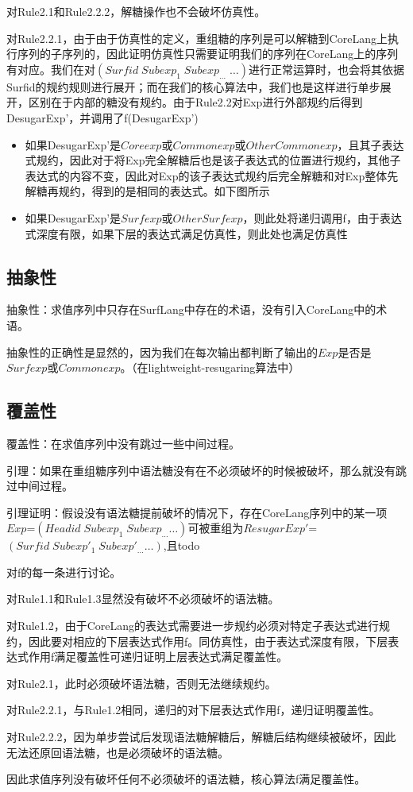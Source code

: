 
对Rule2.1和Rule2.2.2，解糖操作也不会破坏仿真性。

对Rule2.2.1，由于由于仿真性的定义，重组糖的序列是可以解糖到CoreLang上执行序列的子序列的，因此证明仿真性只需要证明我们的序列在CoreLang上的序列有对应。我们在对$(Surfid\;Subexp_{1}\;Subexp_{\ldots}\;\ldots)$进行正常运算时，也会将其依据Surfid的规约规则进行展开；而在我们的核心算法中，我们也是这样进行单步展开，区别在于内部的糖没有规约。由于Rule2.2对Exp进行外部规约后得到DesugarExp'，并调用了f(DesugarExp')
\begin{itemize}
	\item 如果DesugarExp'是$Coreexp$或$Commonexp$或$OtherCommonexp$，且其子表达式规约，因此对于将Exp完全解糖后也是该子表达式的位置进行规约，其他子表达式的内容不变，因此对Exp的该子表达式规约后完全解糖和对Exp整体先解糖再规约，得到的是相同的表达式。如下图所示
	\item 如果DesugarExp'是$Surfexp$或$OtherSurfexp$，则此处将递归调用f，由于表达式深度有限，如果下层的表达式满足仿真性，则此处也满足仿真性
\end{itemize}


\subsection{抽象性}
抽象性：求值序列中只存在SurfLang中存在的术语，没有引入CoreLang中的术语。

抽象性的正确性是显然的，因为我们在每次输出都判断了输出的$Exp$是否是$Surfexp$或$Commonexp$。（在lightweight-resugaring算法中）

\subsection{覆盖性}
覆盖性：在求值序列中没有跳过一些中间过程。

引理：如果在重组糖序列中语法糖没有在不必须破坏的时候被破坏，那么就没有跳过中间过程。

引理证明：假设没有语法糖提前破坏的情况下，存在CoreLang序列中的某一项$Exp$=$(Headid\;Subexp_{1}\;Subexp_{\ldots} \ldots)$可被重组为$ResugarExp'$=$(Surfid\;Subexp'_{1}\;Subexp'_{\ldots} \ldots)$,且todo

对f的每一条进行讨论。

对Rule1.1和Rule1.3显然没有破坏不必须破坏的语法糖。

对Rule1.2，由于CoreLang的表达式需要进一步规约必须对特定子表达式进行规约，因此要对相应的下层表达式作用f。同仿真性，由于表达式深度有限，下层表达式作用f满足覆盖性可递归证明上层表达式满足覆盖性。

对Rule2.1，此时必须破坏语法糖，否则无法继续规约。

对Rule2.2.1，与Rule1.2相同，递归的对下层表达式作用f，递归证明覆盖性。

对Rule2.2.2，因为单步尝试后发现语法糖解糖后，解糖后结构继续被破坏，因此无法还原回语法糖，也是必须破坏的语法糖。

因此求值序列没有破坏任何不必须破坏的语法糖，核心算法f满足覆盖性。


